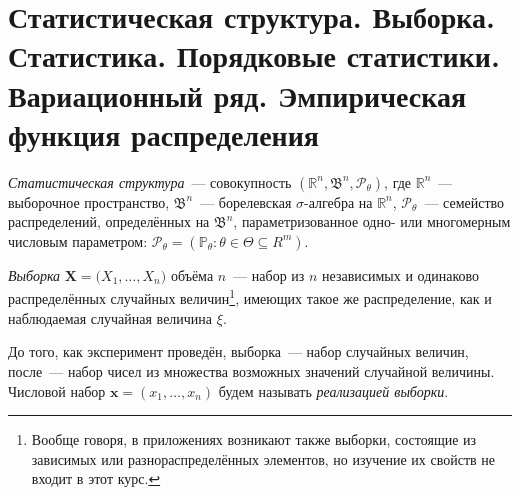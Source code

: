 \section{Статистическая структура. Выборка. Статистика. Порядковые статистики. Вариационный ряд. Эмпирическая функция распределения}

\begin{defn}
    \textit{Статистическая структура}~--- совокупность $(\mathbb{R}^n, \mathfrak{B}^n, \mathcal{P}_\theta)$, 
    где $\mathbb{R}^n$~--- выборочное пространство, 
    $\mathfrak{B}^{n}$~--- борелевская $\sigma$-алгебра на $\mathbb{R}^n$, $\mathcal{P}_\theta$~--- семейство распределений, 
    определённых на $\mathfrak{B}^n$, параметризованное одно- или многомерным числовым параметром: 
    $\mathcal{P}_\theta = (\mathbb{P}_{\theta} \colon \theta \in \Theta \subseteq R^{m})$.
\end{defn}

\newcommand{\MExp}{\mathbb{E}_{\theta}\,} %
\newcommand{\Var}{\mathbb{D}_{\theta}\,} %
\newcommand{\Probab}{\mathbb{P}_{\theta}} %
\newcommand{\Always}{\forall \, \theta \in \Theta} 

\newcommand{\Sample}{\bigl( X_1, \ldots, X_n \bigr)}
\begin{defn}
    \textit{Выборка} $\mathbf{X} = \Sample$ объёма $n$~--- набор из $n$ независимых и одинаково распределённых случайных величин\footnote{Вообще говоря, в приложениях возникают также выборки, состоящие из зависимых или разнораспределённых элементов, но изучение их свойств не входит в этот курс.}, имеющих такое же распределение, как и наблюдаемая случайная величина $\xi$.
\end{defn}

До того, как эксперимент проведён, выборка~--- набор случайных величин, после~--- набор чисел из множества возможных значений случайной величины. 
Числовой набор $\boldsymbol{x} = (x_1, \ldots, x_n)$ будем называть \textit{реализацией выборки}.

